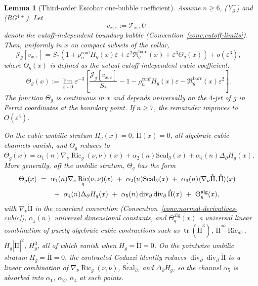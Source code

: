 \documentclass[11pt,reqno,a4paper]{amsart}
\DeclareMathOperator{\Ric}{Ric}
\DeclareMathOperator{\II}{II}
\numberwithin{equation}{section}
\theoremstyle{plain}
\newtheorem{lemma}[theorem]{Lemma}
\newcommand{\Scal}{\mathrm{Scal}}
\theoremstyle{remark}
\theoremstyle{plain}
\begin{document}
\begin{lemma}[Third-order Escobar one-bubble coefficient]\label{lem:third-structure}
Assume $n\ge6$, \textup{(Y$^+_{\partial}$)} and \textup{(BG$^{4+}$)}. Let
\[
v_{x,\varepsilon}:=\mathcal T_{x,\varepsilon}U_+
\]
denote the cutoff-independent boundary bubble (Convention~\ref{conv:cutoff-limits}). Then, uniformly in $x$ on compact subsets of the collar,
\begin{equation}\label{eq:third-expansion}
\mathcal J_g[v_{x,\varepsilon}]
= S_\ast\left(1+\rho_n^{\mathrm{conf}}H_g(x)\varepsilon
+ \varepsilon^2\mathfrak R_g^{\mathrm{bare}}(x)
+ \varepsilon^3\Theta_g(x)\right)
+ o(\varepsilon^3),
\end{equation}
where $\Theta_g(x)$ is defined as the actual cutoff-independent cubic coefficient:
\begin{equation}\label{eq:Theta-definition}
\Theta_g(x)
:=
\lim_{\varepsilon\downarrow0}
\varepsilon^{-3}
\left[
\frac{\mathcal J_g[v_{x,\varepsilon}]}{S_\ast}
-1
-\rho_n^{\mathrm{conf}}H_g(x)\varepsilon
-\mathfrak R_g^{\mathrm{bare}}(x)\varepsilon^2
\right].
\end{equation}
The function $\Theta_g$ is continuous in $x$ and depends universally on the
$4$-jet of $g$ in Fermi coordinates at the boundary point.
If $n\ge7$, the remainder improves to $O(\varepsilon^4)$.

On the cubic umbilic stratum $H_g(x)=0$, $\mathring{\mathrm{II}}(x)=0$,
all algebraic cubic channels vanish, and $\Theta_g$ reduces to
\begin{equation}\label{eq:Theta-umbilic-structure}
\Theta_g(x)
=
\alpha_1(n)\nabla_\nu\Ric_g(\nu,\nu)(x)
+
\alpha_2(n)\dot{\Scal}_\partial(x)
+
\alpha_4(n)\Delta_\partial H_g(x).
\end{equation}
More generally, off the umbilic stratum, $\Theta_g$ has the form
\begin{align}\label{eq:Theta-structure}
\Theta_g(x)\ &=\ \alpha_1(n)\nabla_\nu \Ric_g(\nu,\nu)(x)\ +\ \alpha_2(n)\dot{\Scal}_\partial(x)\ +\ \alpha_3(n)\langle \nabla_\nu \mathring{\II},\mathring{\II}\rangle(x)\ \notag\\&\hspace{2em}+\ \alpha_4(n)\Delta_{\partial} H_g(x)\ +\ \alpha_5(n)\operatorname{div}_\partial\operatorname{div}_\partial\mathring{\mathrm{II}}(x)\ +\ \Theta_g^{\mathrm{alg}}(x),
\end{align}
with $\nabla_\nu\mathring{\mathrm{II}}$ in the covariant convention
(Convention~\ref{conv:normal-derivatives-cubic}),
$\alpha_j(n)$ universal dimensional constants,
and $\Theta_g^{\mathrm{alg}}(x)$ a universal linear combination of purely
algebraic cubic contractions such as
$\operatorname{tr}(\mathring{\mathrm{II}}^3)$,
$\mathring{\mathrm{II}}^{ab}\Ric_{ab}$,
$H_g|\mathring{\mathrm{II}}|^2$, $H_g^3$,
all of which vanish when $H_g=\mathring{\mathrm{II}}=0$.
On the pointwise umbilic stratum $H_g=\mathring{\mathrm{II}}=0$,
the contracted Codazzi identity reduces
$\operatorname{div}_\partial\operatorname{div}_\partial\mathring{\mathrm{II}}$
to a linear combination of $\nabla_\nu\Ric_g(\nu,\nu)$,
$\dot{\mathrm{Scal}}_\partial$, and $\Delta_\partial H_g$, so the channel
$\alpha_5$ is absorbed into $\alpha_1$, $\alpha_2$, $\alpha_4$ at such points.


\end{lemma}
\end{document}
